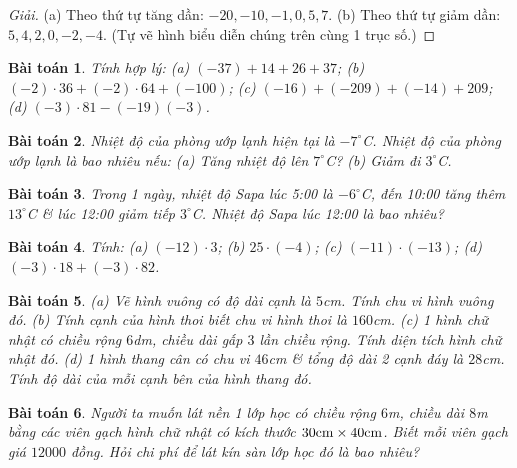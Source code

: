 \documentclass[11pt]{article}
\numberwithin{equation}{section}
\newtheorem{baitoan}{Bài toán}[section]
\begin{document}
\begin{proof}[Giải]
	(a) Theo thứ tự tăng dần: $-20,-10,-1,0,5,7$. (b) Theo thứ tự giảm dần: $5,4,2,0,-2,-4$. (Tự vẽ hình biểu diễn chúng trên cùng 1 trục số.)
\end{proof}

\begin{baitoan}
	Tính hợp lý: (a) $(-37) + 14 + 26 + 37$; (b) $(-2)\cdot36 + (-2)\cdot64 + (-100)$; (c) $(-16) + (-209) + (-14) + 209$; (d) $(-3)\cdot81 - (-19)(-3)$.
\end{baitoan}

\begin{baitoan}
	Nhiệt độ của phòng ướp lạnh hiện tại là $-7^\circ$C. Nhiệt độ của phòng ướp lạnh là bao nhiêu nếu: (a) Tăng nhiệt độ lên $7^\circ$C? (b) Giảm đi $3^\circ$C.
\end{baitoan}

\begin{baitoan}
	Trong 1 ngày, nhiệt độ Sapa lúc 5:00 là $-6^\circ$C, đến 10:00 tăng thêm $13^\circ$C \& lúc 12:00 giảm tiếp $3^\circ$C. Nhiệt độ Sapa lúc 12:00 là bao nhiêu?
\end{baitoan}

\begin{baitoan}
	Tính: (a) $(-12)\cdot3$; (b) $25\cdot(-4)$; (c) $(-11)\cdot(-13)$; (d) $(-3)\cdot18 + (-3)\cdot82$.
\end{baitoan}

\begin{baitoan}
	(a) Vẽ hình vuông có độ dài cạnh là $5$\emph{cm}. Tính chu vi hình vuông đó. (b) Tính cạnh của hình thoi biết chu vi hình thoi là $160$\emph{cm}. (c) 1 hình chữ nhật có chiều rộng $6$\emph{dm}, chiều dài gấp $3$ lần chiều rộng. Tính diện tích hình chữ nhật đó. (d) 1 hình thang cân có chu vi $46$\emph{cm} \& tổng độ dài 2 cạnh đáy là $28$\emph{cm}. Tính độ dài của mỗi cạnh bên của hình thang đó.
\end{baitoan}

\begin{baitoan}
	Người ta muốn lát nền 1 lớp học có chiều rộng $6$\emph{m}, chiều dài $8$\emph{m} bằng các viên gạch hình chữ nhật có kích thước $\rm30cm\times40cm$. Biết mỗi viên gạch giá $12000$ đồng. Hỏi chi phí để lát kín sàn lớp học đó là bao nhiêu?
\end{baitoan}


\printbibliography[heading=bibintoc]
	
\end{document}
